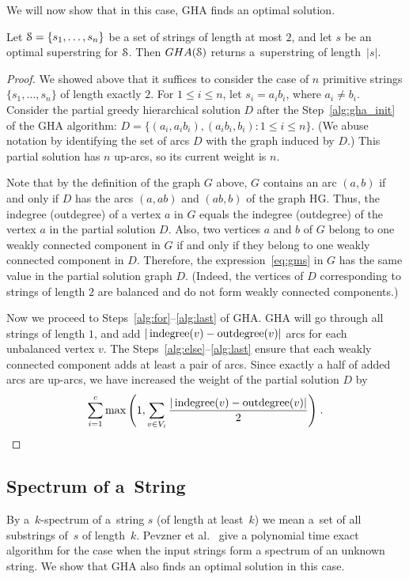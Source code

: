 We will now show that in this case, GHA finds an optimal solution.

\begin{lemma}
Let ${\cal S}=\{s_1,\ldots,s_n\}$ be a set of strings of length at most $2$, and let $s$ be an optimal superstring for ${\cal S}$. Then $GHA({\cal S})$ returns a~superstring of length~$|s|$. 
\end{lemma}

\begin{proof}
We showed above that it suffices to consider the case of $n$ primitive strings $\{s_1,\ldots,s_n\}$ of length exactly $2$. For $1\leq i\leq n$, let $s_i=a_i b_i$, where $a_i\neq b_i$. Consider the partial greedy hierarchical solution $D$ after the Step~\ref{alg:gha_init} of the GHA algorithm: $D=\{(a_i, a_ib_i), (a_ib_i, b_i): 1\leq i\leq n \}$. (We abuse notation by identifying the set of arcs $D$ with the graph induced by $D$.) This partial solution has $n$ up-arcs, so its current weight is $n$. 

Note that by the definition of the graph $G$ above, $G$ contains an arc $(a, b)$ if and only if $D$ has the arcs $(a, ab)$ and $(ab, b)$ of the graph HG. Thus, the indegree (outdegree) of a vertex $a$ in $G$ equals the indegree (outdegree) of the vertex $a$ in the partial solution $D$. Also, two vertices $a$ and $b$ of $G$ belong to one weakly connected component in $G$ if and only if they belong to one weakly connected component in $D$. Therefore, the expression~\eqref{eq:gms} in $G$ has the same value in the partial solution graph $D$. (Indeed, the vertices of $D$ corresponding to strings of length $2$ are balanced and do not form weakly connected components.) 

Now we proceed to Steps~\ref{alg:for}--\ref{alg:last} of GHA. GHA will go through all strings of length $1$, and add $|\operatorname{indegree}(v) - \operatorname{outdegree}(v)|$ arcs for each unbalanced vertex $v$. The Steps~\ref{alg:else}--\ref{alg:last} ensure that each weakly connected component adds at least a pair of arcs. Since exactly a half of added arcs are up-arcs, we have increased the weight of the partial solution $D$ by
\begin{align*}
\sum_{i=1}^{c} {\max\left( 1, \sum_{v \in V_i}{ \frac{ |\operatorname{indegree}(v) - \operatorname{outdegree}(v)|}{2} }\right)} \; .
\end{align*}
\end{proof}

\subsection{Spectrum of a~String}
By a~$k$-spectrum of a~string $s$ 
(of length at least~$k$)
we mean a~set of all substrings of~$s$ of length~$k$.
Pevzner et al.~\cite{pevzner2001eulerian} give a polynomial time exact algorithm for the case when the input strings form a spectrum of an unknown string. We show that GHA also finds an optimal solution in this case.

